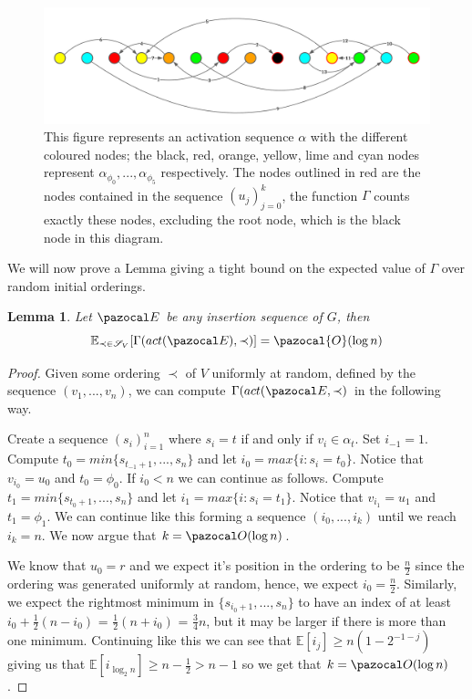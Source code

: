 \documentclass{report}
\newtheorem{lemma}[theorem]{Lemma}
\begin{document}
\begin{figure}[htp]
    \centering
    \includegraphics[width=14cm]{Images/ActSeqPic.png}
    \caption{This figure represents an activation sequence $\alpha$ with the different coloured nodes; the black, red, orange, yellow, lime and cyan nodes represent $\alpha_{\phi_0},...,\alpha_{\phi_5}$ respectively. The nodes outlined in red are the nodes contained in the sequence $(u_j)_{j=0}^k$, the function $\Gamma$ counts exactly these nodes, excluding the root node, which is the black node in this diagram.}
    \label{fig:activationsequence}
\end{figure}

We will now prove a Lemma giving a tight bound on the expected value of $\Gamma$ over random initial orderings.

\begin{lemma}\label{gamma lemma 1}
Let $\pazocal E$ be any insertion sequence of $G$, then
\[ \mathbb{E}_{\prec \in \mathcal{S}_V}[\Gamma(act(\pazocal E), \prec)] = \pazocal{O}(\log n) \]
\end{lemma}

\begin{proof}
Given some ordering $\prec$ of $V$ uniformly at random, defined by the sequence $(v_1,...,v_n)$, we can compute $\Gamma(act(\pazocal E, \prec)$ in the following way.

Create a sequence $(s_i)_{i=1}^n$ where $s_i = t$ if and only if $v_i \in \alpha_t$. Set $i_{-1}=1$. Compute $t_0 = min\{s_{t_{-1}+1},...,s_n\}$ and let $i_0=max\{i:s_i=t_0\}$. Notice that $v_{i_0} = u_0$ and $t_0 = \phi_0$. If $i_0 < n$ we can continue as follows. Compute $t_1 = min\{s_{t_{0}+1},...,s_n\}$ and let $i_1=max\{i:s_i=t_1\}$. Notice that $v_{i_1} = u_1$ and $t_1 = \phi_1$. We can continue like this forming a sequence $(i_0,...,i_k)$ until we reach $i_k = n$. We now argue that $k = \pazocal O(\log n)$.

We know that $u_0 = r$ and we expect it's position in the ordering to be $\frac{n}{2}$ since the ordering was generated uniformly at random, hence, we expect $i_0 = \frac{n}{2}$. Similarly, we expect the rightmost minimum in $\{s_{i_0+1},...,s_n\}$ to have an index of at least $i_0 + \frac{1}{2}(n - i_0)$ = $\frac{1}{2}(n+i_0)$ = $\frac{3}{4}n$, but it may be larger if there is more than one minimum. Continuing like this we can see that $\mathbb{E}[i_j] \geq n(1-2^{-1-j})$ giving us that $\mathbb{E}[i_{\log_{2}n}] \geq n-\frac{1}{2} > n - 1$ so we get that $k = \pazocal O(\log n)$.
\end{proof}
\end{document}
